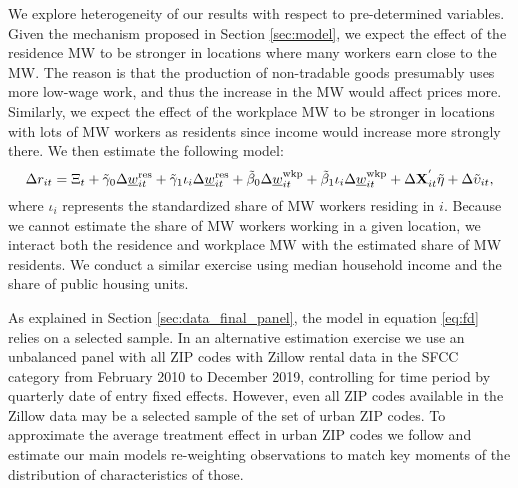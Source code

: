 We explore heterogeneity of our results with respect to pre-determined 
variables.
Given the mechanism proposed in Section \ref{sec:model}, we expect the effect 
of the residence MW to be stronger in locations where many workers earn 
close to the MW.
The reason is that the production of non-tradable goods presumably uses more
low-wage work, and thus the increase in the MW would affect prices more.
Similarly, we expect the effect of the workplace MW to be stronger in locations
with lots of MW workers as residents since income would increase more 
strongly there.
We then estimate the following model:
\begin{equation*}\label{eq:fd_heterogeneity}
    \Delta r_{it} = \Xi_t
                  + \tilde\gamma_0 \Delta \underline{w}^{\text{res}}_{it}
                  + \tilde\gamma_1 \iota_i \Delta \underline{w}^{\text{res}}_{it}
                  + \tilde\beta_0 \Delta \underline{w}^{\text{wkp}}_{it}
                  + \tilde\beta_1 \iota_i \Delta \underline{w}^{\text{wkp}}_{it}
                  + \Delta \mathbf{X}^{'}_{it}\tilde\eta
                  + \Delta \tilde\upsilon_{it} ,
\end{equation*}
where $\iota_i$ represents the standardized share of MW workers residing in $i$.
Because we cannot estimate the share of MW workers working in a given location,
we interact both the residence and workplace MW with the estimated share of 
MW residents.
We conduct a similar exercise using median household income and the share of 
public housing units.

As explained in Section \ref{sec:data_final_panel}, 
the model in equation \eqref{eq:fd} relies on a selected sample.
In an alternative estimation exercise we use an unbalanced panel with all 
ZIP codes with Zillow rental data in the SFCC category 
from February 2010 to December 2019, controlling for time period by 
quarterly date of entry fixed effects.
However, even all ZIP codes available in the Zillow data may be 
a selected sample of the set of urban ZIP codes.
To approximate the average treatment effect in urban ZIP codes we follow
\textcite{Hainmueller2012} and estimate our main models re-weighting 
observations to match key moments of the distribution of characteristics of 
those.
